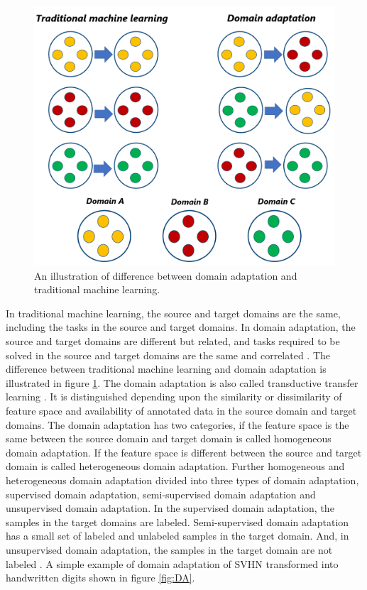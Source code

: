 \begin{figure}[H]
        \begin{center}
	 	    \includegraphics[scale=0.28]{images/Introduction/DomainAdaptation.png}
	    \caption[An illustration of difference between domain adaptation and traditional machine learning.]{An illustration of difference between domain adaptation and traditional machine learning.}
	    \label{fig:DomainAdaptation}
	    \end{center}
\end{figure}

In traditional machine learning, the source and target domains are the same, including the tasks in the source and target domains. In domain adaptation, the source and target domains are different but related, and tasks required to be solved in the source and target domains are the same and correlated \cite{5288526}. The difference between traditional machine learning and domain adaptation is illustrated in figure \ref{fig:DomainAdaptation}. The domain adaptation is also called transductive transfer learning \cite{5288526}. It is distinguished depending upon the similarity or dissimilarity of feature space and availability of annotated data in the source domain and target domains. The domain adaptation has two categories, if the feature space is the same between the source domain and target domain is called homogeneous domain adaptation. If the feature space is different between the source and target domain is called heterogeneous domain adaptation. Further homogeneous and heterogeneous domain adaptation divided into three types of domain adaptation, supervised domain adaptation, semi-supervised domain adaptation and unsupervised domain adaptation. In the supervised domain adaptation, the samples in the target domains are labeled. Semi-supervised domain adaptation has a small set of labeled and unlabeled samples in the target domain. And, in unsupervised domain adaptation, the samples in the target domain are not labeled \cite{5288526}. A simple example of domain adaptation of  \ac{SVHN} transformed into handwritten digits shown in figure \ref{fig:DA}.


